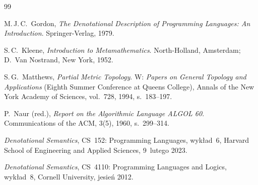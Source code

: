 \documentclass[11pt,a4paper]{article}
\theoremstyle{definition}
\theoremstyle{plain}
\begin{document}
{}
\begin{thebibliography}{99}

  M.\,J.\,C.~Gordon, \emph{The Denotational Description of Programming Languages: An Introduction}. Springer-Verlag, 1979.

  S.\,C.~Kleene, \emph{Introduction to Metamathematics}. North-Holland, Amsterdam; D.~Van Nostrand, New York, 1952.

  S.\,G.~Matthews, \emph{Partial Metric Topology}. W: \emph{Papers on General Topology and Applications} (Eighth Summer Conference at Queens College), Annals of the New York Academy of Sciences, vol.~728, 1994, s.~183--197.

  P.~Naur (red.), \emph{Report on the Algorithmic Language ALGOL 60}. Communications of the ACM, 3(5), 1960, s.~299--314.

  \emph{Denotational Semantics}, CS~152: Programming Languages, wykład~6, Harvard School of Engineering and Applied Sciences, 9~lutego 2023.

  \emph{Denotational Semantics}, CS~4110: Programming Languages and Logics, wykład~8, Cornell University, jesień 2012.


\end{thebibliography}
\end{document}
